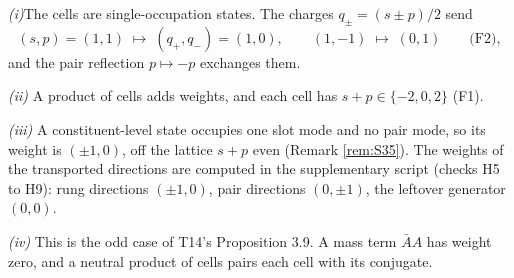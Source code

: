 \textit{(i)}\enspace The cells are single-occupation states. The charges $q_{\pm} = (s \pm p)/2$ send
\[
(s, p) = (1, 1) \;\mapsto\; (q_{+}, q_{-}) = (1, 0), \qquad (1, -1) \;\mapsto\; (0, 1) \qquad \text{(F2)},
\]
and the pair reflection $p \mapsto -p$ exchanges them.



\emph{(ii)}  A product of cells adds weights, and each cell has $s + p \in \{-2, 0, 2\}$ (F1).



\emph{(iii)}  A constituent-level state occupies one slot mode and no pair mode, so its weight is $(\pm 1, 0)$, off the lattice $s + p$ even (Remark \ref{rem:S35}). The weights of the transported directions are computed in the supplementary script  (checks H5 to H9): rung directions $(\pm 1, 0)$, pair directions $(0, \pm 1)$, the leftover generator $(0,0)$.



\emph{(iv)}  This is the odd case of T14's Proposition 3.9. A mass term $\bar{A}A$ has weight zero, and a neutral product of cells pairs each cell with its conjugate.
